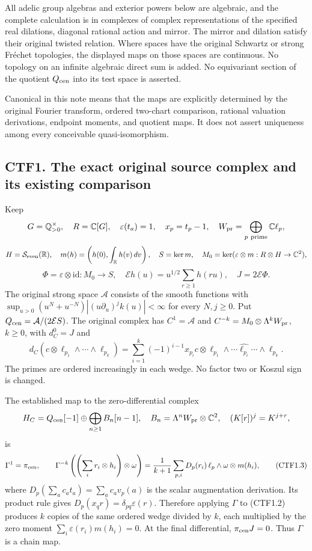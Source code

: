 All adelic group algebras and exterior powers below are algebraic, and
the complete calculation is in complexes of complex representations of
the specified real dilations, diagonal rational action and mirror. The
mirror and dilation satisfy their original twisted relation. Where
spaces have the original Schwartz or strong Fréchet topologies, the
displayed maps on those spaces are continuous. No topology on an
infinite algebraic direct sum is added. No equivariant section of the
quotient \(Q_{\rm cen}\) into its test space is asserted.

Canonical in this note means that the maps are explicitly determined by
the original Fourier transform, ordered two-chart comparison, rational
valuation derivations, endpoint moments, and quotient maps. It does not
assert uniqueness among every conceivable quasi-isomorphism.

\subsection{CTF1. The exact original source complex and its existing
comparison}\label{ctf1.-the-exact-original-source-complex-and-its-existing-comparison}

Keep \[
G=\mathbb Q_{>0}^{\times},\quad R=\mathbb C[G],\quad
\varepsilon(t_a)=1,\quad x_p=t_p-1,\quad
W_{\rm pr}=\bigoplus_{p\ {\rm prime}}\mathbb C\ell_p,
\] \[
H=\mathcal S_{\rm even}(\mathbb R),\quad
m(h)=\left(h(0),\int_{\mathbb R}h(v)\,dv\right),\quad
S=\ker m,\quad M_0=\ker(\varepsilon\otimes m:R\otimes H\to\mathbb C^2),
\] \[
\Phi=\varepsilon\otimes\mathrm{id}:M_0\to S,\quad
\mathcal Eh(u)=u^{1/2}\sum_{r\ge1}h(ru),\quad
J=2\mathcal E\Phi.
\tag{CTF1.1}
\] The original strong space \(\mathcal A\) consists of the smooth
functions with \(\sup_{u>0}(u^N+u^{-N})|(u\partial_u)^jk(u)|<\infty\)
for every \(N,j\ge0\). Put \(Q_{\rm cen}=\mathcal A/(2\mathcal ES)\).
The original complex has \(C^1=\mathcal A\) and
\(C^{-k}=M_0\otimes\Lambda^kW_{\rm pr}\), \(k\ge0\), with \(d_C^0=J\)
and \[
d_C(c\otimes\ell_{p_1}\wedge\cdots\wedge\ell_{p_k})
=\sum_{i=1}^k(-1)^{i-1}x_{p_i}c\otimes
\ell_{p_1}\wedge\cdots\widehat{\ell_{p_i}}\cdots\wedge\ell_{p_k}.
\tag{CTF1.2}
\] The primes are ordered increasingly in each wedge. No factor two or
Koszul sign is changed.

The established map to the zero-differential complex \[
H_C=Q_{\rm cen}[-1]\oplus\bigoplus_{n\ge1}B_n[n-1],
\quad B_n=\Lambda^nW_{\rm pr}\otimes\mathbb C^2,
\quad(K[r])^j=K^{j+r},
\] is \[
\Gamma^1=\pi_{\rm cen},\qquad
\Gamma^{-k}\left(\left(\sum_i r_i\otimes h_i\right)\otimes\omega\right)
=\frac1{k+1}\sum_{p,i}D_p(r_i)\,
\ell_p\wedge\omega\otimes m(h_i),
\tag{CTF1.3}
\] where \(D_p(\sum_ac_at_a)=\sum_ac_av_p(a)\) is the scalar
augmentation derivation. Its product rule gives
\(D_p(x_qr)=\delta_{pq}\varepsilon(r)\). Therefore applying \(\Gamma\)
to (CTF1.2) produces \(k\) copies of the same ordered wedge divided by
\(k\), each multiplied by the zero moment
\(\sum_i\varepsilon(r_i)m(h_i)=0\). At the final differential,
\(\pi_{\rm cen}J=0\). Thus \(\Gamma\) is a chain map.

